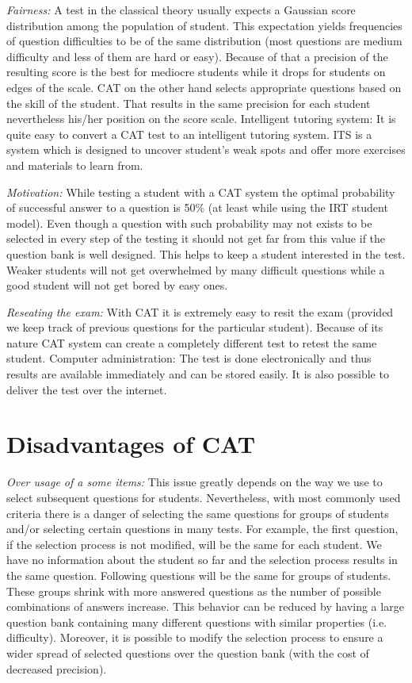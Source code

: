 \emph{Fairness:} A test in the classical theory usually expects a Gaussian score distribution among the population of student. This expectation yields frequencies of question difficulties to be of the same distribution (most questions are medium difficulty and less of them are hard or easy). Because of that a precision of the resulting score is the best for mediocre students while it drops for students on edges of the scale. CAT on the other hand selects appropriate questions based on the skill of the student. That results in the same precision for each student nevertheless his/her position on the score scale.
Intelligent tutoring system: It is quite easy to convert a CAT test to an intelligent tutoring system. ITS is a system which is designed to uncover student’s weak spots and offer more exercises and materials to learn from.

\emph{Motivation: }While testing a student with a CAT system the optimal probability of successful answer to a question is 50\% (at least while using the IRT student model). Even though a question with such probability may not exists to be selected in every step of the testing it should not get far from this value if the question bank is well designed. This helps to keep a student interested in the test. Weaker students will not get overwhelmed by many difficult questions while a good student will not get bored by easy ones.

\emph{Reseating the exam: }With CAT it is extremely easy to resit the exam (provided we keep track of previous questions for the particular student). Because of its nature CAT system can create a completely different test to retest the same student.
Computer administration: The test is done electronically and thus results are available immediately and can be stored easily. It is also possible to deliver the test over the internet.

\section{Disadvantages of CAT}
\emph{Over usage of a some items: }This issue greatly depends on the way we use to select subsequent questions for students. Nevertheless, with most commonly used criteria there is a danger of selecting the same questions for groups of students and/or selecting certain questions in many tests. For example, the first question, if the selection process is not modified, will be the same for each student. We have no information about the student so far and the selection process results in the same question. Following questions will be the same for groups of students. These groups shrink with more answered questions as the number of possible combinations of answers increase. This behavior can be reduced by having a large question bank containing many different questions with similar properties (i.e. difficulty). Moreover, it is possible to modify the selection process to ensure a wider spread of selected questions over the question bank (with the cost of decreased precision).

